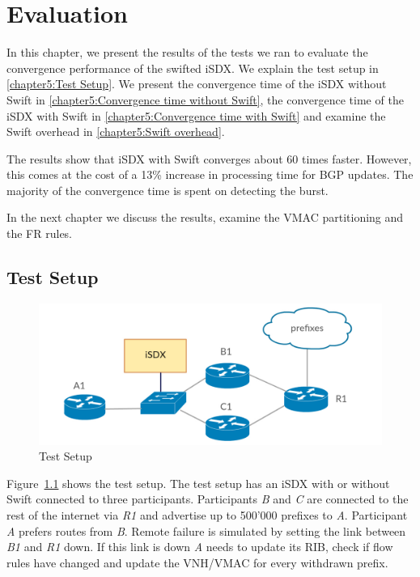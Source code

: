 \chapter{\label{chapter5}Evaluation}

In this chapter, we present the results of the tests we ran to evaluate the convergence performance of the swifted iSDX. We explain the test setup in \ref{chapter5:Test Setup}. We present the convergence time of the iSDX without Swift in \ref{chapter5:Convergence time without Swift}, the convergence time of the iSDX with Swift in \ref{chapter5:Convergence time with Swift} and examine the Swift overhead in \ref{chapter5:Swift overhead}.

The results show that iSDX with Swift converges about 60 times faster. However, this comes at the cost of a 13\% increase in processing time for BGP updates. The majority of the convergence time is spent on detecting the burst.

In the next chapter we discuss the results, examine the VMAC partitioning and the FR rules.

\section{\label{chapter5:Test Setup}Test Setup}

\begin{figure}[h]
\center
\includegraphics[scale = 0.36]{Figures/eval_exp_setup.pdf}
\caption{Test Setup}
\label{fig:test-setup}
\end{figure}

Figure~\ref{fig:test-setup} shows the test setup.
The test setup has an iSDX with or without Swift connected to three participants. Participants \emph{B} and \emph{C} are connected to the rest of the internet via \emph{R1} and advertise up to 500'000 prefixes to \emph{A}. Participant \emph{A} prefers routes from \emph{B}. Remote failure is simulated by setting the link between \emph{B1} and \emph{R1} down. If this link is down \emph{A} needs to update its RIB, check if flow rules have changed and update the VNH/VMAC for every withdrawn prefix.

